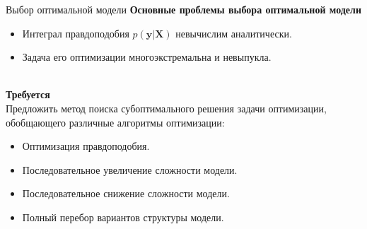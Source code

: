 \documentclass[usenames,dvipsnames,11pt,pdf,utf8,russian,aspectratio=169]{beamer}
\begin{document}
\begin{frame}{Выбор оптимальной модели}
\textbf{Основные проблемы выбора оптимальной модели}\\
\begin{itemize}
\item Интеграл правдоподобия $p(\mathbf{y}|\mathbf{X})$ невычислим аналитически.
\item Задача его оптимизации многоэкстремальна и невыпукла.
\end{itemize}
~\\
\textbf{Требуется}\\ 
Предложить метод поиска субоптимального решения задачи оптимизации, обобщающего различные алгоритмы оптимизации:
\begin{itemize}
\item Оптимизация правдоподобия.
\item Последовательное увеличение сложности модели.
\item Последовательное снижение сложности модели.
\item Полный перебор вариантов структуры модели.
\end{itemize}

\end{frame}       


                                                                                                                                   
                                                                                                                                    
\end{document}

